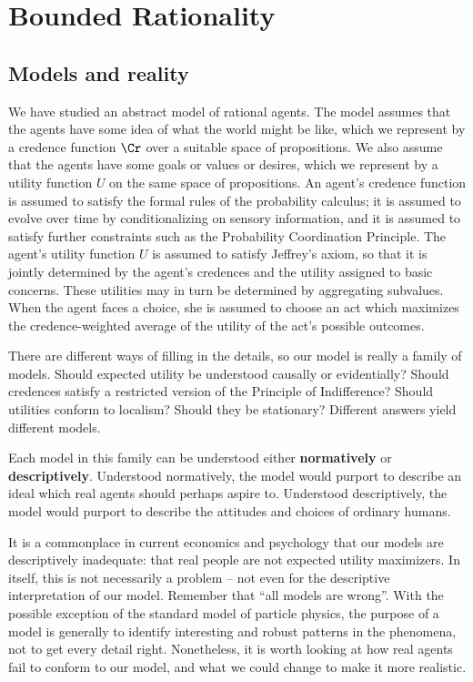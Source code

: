 \chapter{Bounded Rationality}


\section{Models and reality}

We have studied an abstract model of rational agents. The model
assumes that the agents have some idea of what the
world might be like, which we represent by a credence function $\Cr$
over a suitable space of propositions. We also assume that the agents
have some goals or values or desires, which we represent by a utility
function $U$ on the same space of propositions. An agent's credence
function is assumed to satisfy the formal rules of the probability
calculus; it is assumed to evolve over time by conditionalizing on
sensory information, and it is assumed to satisfy further constraints
such as the Probability Coordination Principle. The agent's utility
function $U$ is assumed to satisfy Jeffrey's axiom, so that it is
jointly determined by the agent's credences and the utility assigned
to basic concerns. These utilities may in turn be determined by
aggregating subvalues. When the agent faces a choice, she is assumed
to choose an act which maximizes the credence-weighted average of the
utility of the act's possible outcomes.

There are different ways of filling in the details, so our model is
really a family of models. Should expected utility be understood
causally or evidentially? Should credences satisfy a restricted
version of the Principle of Indifference? Should utilities conform to
localism? Should they be stationary? Different answers yield different
models.

Each model in this family can be understood either
\textbf{normatively} or \textbf{descriptively}. Understood
normatively, the model would purport to describe an ideal which real
agents should perhaps aspire to. Understood descriptively, the model
would purport to describe the attitudes and choices of ordinary
humans.

It is a commonplace in current economics and psychology that our
models are descriptively inadequate: that real people are not expected
utility maximizers. In itself, this is not necessarily a problem --
not even for the descriptive interpretation of our model. Remember
that ``all models are wrong''. With the possible exception of the
standard model of particle physics, the purpose of a model is
generally to identify interesting and robust patterns in the
phenomena, not to get every detail right.  Nonetheless, it is worth
looking at how real agents fail to conform to our model, and what we
could change to make it more realistic.

